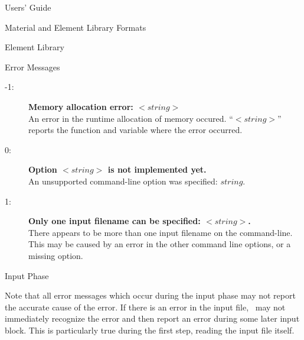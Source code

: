 \begin{chapter}{Users' Guide\label{app:user.guide}}
\begin{section}{Material and Element Library Formats}
\begin{subsection}{Element Library\label{app:user.elelib}}
      \begin{center}
      \end{center}

    \end{subsection}

  \end{section}


  \begin{section}{Error Messages}\label{app:errors}
    \renewcommand{\baselinestretch}{1.12}\normalsize
    \begin{description}
    \item[-1:]\textbf{Memory allocation error: $<\!\!string\!\!>$}\ \\
      An error in the runtime allocation of memory occured.
      ``$<\!\!string\!\!>$'' reports the function and variable where
      the error occurred.
    \item[0:]\textbf{Option $<\!\!string\!\!>$ is not implemented yet.} \ \\
      An unsupported command-line option was specified: $string$.
    \item[1:]\textbf{Only one input filename can be specified:
        $<\!\!string\!\!>$.}\ \\
      There appears to be more than one input filename on the
      command-line.  This may be caused by an error in the other
      command line options, or a missing option.
    \end{description}
    
    \begin{subsection}{Input Phase}
      
      Note that all error messages which occur during the input phase
      may not report the accurate cause of the error.  If there is an
      error in the input file, \ALARA\ may not immediately recognize
      the error and then report an error during some later input
      block.  This is particularly true during the first step, reading
      the input file itself.
      

\end{subsection}
\end{section}
\end{chapter}
